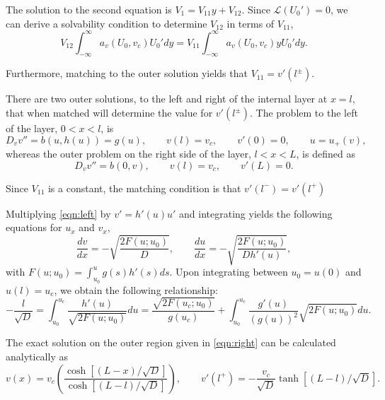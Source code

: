 \documentclass[a4paper,10pt]{article}
\begin{document}
The solution to the second equation is $V_1 = V_{11}y + V_{12}$. Since $\mathcal{L}(U_0')=0$, we can derive a solvability condition to determine $V_{12}$ in terms of $V_{11}$,
% 
\begin{equation}
  \label{eqn:solvability}
  V_{12}\int_{-\infty}^{\infty}a_v(U_0,v_c)U_0'dy = V_{11}\int_{-\infty}^{\infty}a_v(U_0,v_c)yU_0'dy.
\end{equation}

Furthermore, matching to the outer solution yields that $V_{11} = v'(l^{\pm})$.

There are two outer solutions, to the left and right of the internal layer at $x=l$, that when matched will determine the value for $v'(l^{\pm})$. The problem to the left of the layer, $0<x<l$, is
% 
\begin{equation}
  \label{eqn:left}
  D_v v'' = b(u,h(u)) = g(u),\qquad v(l)=v_c,\qquad v'(0)=0,\qquad u = u_+(v),
\end{equation}
% 
whereas the outer problem on the right side of the layer, $l<x<L$, is defined as
% 
\begin{equation}
  \label{eqn:right}
  D_v v'' = b(0,v),\qquad v(l)=v_c,\qquad v'(L)=0.
\end{equation}

Since $V_{11}$ is a constant, the matching condition is that $v'(l^-) = v'(l^+)$

Multiplying \eqref{eqn:left} by $v'=h'(u)u'$ and integrating yields the following equations for $u_x$ and $v_x$,
% 
\begin{equation}
  \frac{dv}{dx} = -\sqrt{\frac{2F(u;u_0)}{D}},\qquad \frac{du}{dx} = -\sqrt{\frac{2F(u;u_0)}{Dh'(u)}},
\end{equation}
% 
with $F(u;u_0) = \int_{u_0}^u g(s)h'(s)ds$. Upon integrating between $u_0=u(0)$ and $u(l)=u_c$, we obtain the following relationship:
% 
\begin{equation}
  \label{eqn:feo1}
  -\frac{l}{\sqrt{D}} = \int_{u_0}^{u_c}\frac{h'(u)}{\sqrt{2F(u;u_0)}}du = \frac{\sqrt{2F(u_c;u_0)}}{g(u_c)} + \int_{u_0}^{u_c}\frac{g'(u)}{(g(u))^2}\sqrt{2F(u;u_0)}du.
\end{equation}

The exact solution on the outer region given in \eqref{eqn:right} can be calculated analytically as 
% 
\begin{equation}
  \label{eqn:outer1}
  v(x) = v_c\left(\frac{\cosh\left[(L-x)/\sqrt{D}\right]}{\cosh\left[(L-l)/\sqrt{D}\right]}\right),\qquad v'(l^+)=-\frac{v_c}{\sqrt{D}}\tanh\left[(L-l)/\sqrt{D}\right].
\end{equation}
\end{document}
